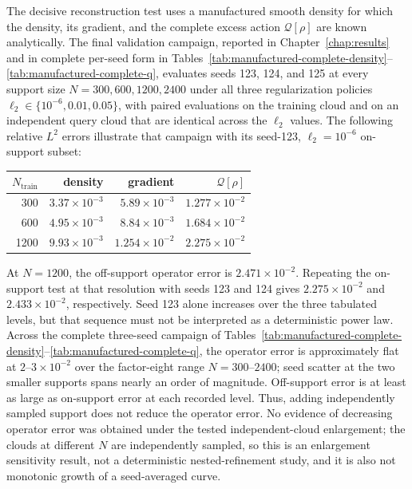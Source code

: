 \documentclass[
  11pt,
  letterpaper,
  onehalfspacing,
  normalmargins,
  equalmargins,
  oneside
]{ut-thesis}
\begin{document}
The decisive reconstruction test uses a manufactured smooth density for which
the density, its gradient, and the complete excess action
\(\mathcal Q[\rho]\) are known analytically. The final validation campaign,
reported in Chapter~\ref{chap:results} and in complete per-seed form in
Tables~\ref{tab:manufactured-complete-density}--\ref{tab:manufactured-complete-q},
evaluates seeds 123, 124, and 125 at every support size
\(N=300,600,1200,2400\) under all three regularization policies
\(\ell_2\in\{10^{-6},0.01,0.05\}\), with paired evaluations on the training
cloud and on an independent query cloud that are identical across the
\(\ell_2\) values. The following relative \(L^2\) errors illustrate that
campaign with its seed-123, \(\ell_2=10^{-6}\) on-support subset:
\begin{center}
\begin{tabular}{rrrr}
\toprule
\(N_{\mathrm{train}}\) &
density &
gradient &
\(\mathcal Q[\rho]\) \\
\midrule
300  & \(3.37\times10^{-3}\) & \(5.89\times10^{-3}\) & \(1.277\times10^{-2}\) \\
600  & \(4.95\times10^{-3}\) & \(8.84\times10^{-3}\) & \(1.684\times10^{-2}\) \\
1200 & \(9.93\times10^{-3}\) & \(1.254\times10^{-2}\) & \(2.275\times10^{-2}\) \\
\bottomrule
\end{tabular}
\end{center}
At \(N=1200\), the off-support operator error is
\(2.471\times10^{-2}\). Repeating the on-support test at that resolution with
seeds 123 and 124 gives \(2.275\times10^{-2}\) and
\(2.433\times10^{-2}\), respectively. Seed 123 alone increases over the three
tabulated levels, but that sequence must not be interpreted as a deterministic
power law. Across the complete three-seed campaign of
Tables~\ref{tab:manufactured-complete-density}--\ref{tab:manufactured-complete-q},
the operator error is
approximately flat at \(2\)--\(3\times10^{-2}\) over the factor-eight range
\(N=300\)--\(2400\); seed scatter at the two smaller supports spans nearly an
order of magnitude. Off-support error is at least as large as on-support error
at each recorded level. Thus, adding independently sampled support does not
reduce the operator error. No evidence of decreasing operator error was
obtained under the tested independent-cloud enlargement; the clouds at
different \(N\) are independently sampled, so this is an enlargement
sensitivity result, not a deterministic nested-refinement study, and it is
also not monotonic growth of a seed-averaged curve.
\end{document}
